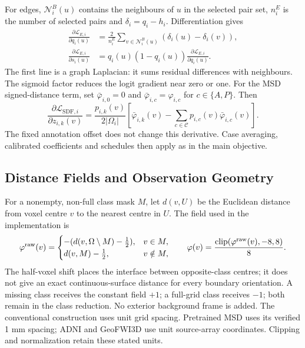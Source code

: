 For edges, $\mathcal N_i^B(u)$ contains the neighbours of $u$ in the
selected pair set, $n_i^E$ is the number of selected pairs and
$\delta_i=q_i-h_i$. Differentiation gives
\begin{equation}
\begin{aligned}
\frac{\partial\mathcal L_{E,i}}{\partial q_i(u)}
 &=\frac{2}{n_i^E}\sum_{v\in\mathcal N_i^B(u)}
     (\delta_i(u)-\delta_i(v)),\\
\frac{\partial\mathcal L_{E,i}}{\partial s_i(u)}
 &=q_i(u)(1-q_i(u))\frac{\partial\mathcal L_{E,i}}{\partial q_i(u)}.
\end{aligned}\label{eq:edge-logit-gradient}
\end{equation}
The first line is a graph Laplacian: it sums residual differences with
neighbours. The sigmoid factor reduces the logit gradient near zero or
one. For the MSD signed-distance term, set $\bar\varphi_{i,0}=0$ and
$\bar\varphi_{i,c}=\varphi_{i,c}$ for $c\in\{A,P\}$. Then
\begin{equation}
\frac{\partial\mathcal L_{\mathrm{SDF},i}}{\partial z_{i,k}(v)}
=\frac{p_{i,k}(v)}{2|\Omega_i|}
 \left[\bar\varphi_{i,k}(v)-\sum_{c\in\mathcal C}
 p_{i,c}(v)\bar\varphi_{i,c}(v)\right].
\label{eq:sdf-logit-gradient}
\end{equation}
The fixed annotation offset does not change this derivative. Case
averaging, calibrated coefficients and schedules then apply as in the
main objective.

\subsection{Distance Fields and Observation Geometry}
\label{sec:sdf-construction-details}

For a nonempty, non-full class mask $M$, let $d(v,U)$ be the Euclidean
distance from voxel centre $v$ to the nearest centre in $U$. The field
used in the implementation is
\begin{equation}
\varphi^{\rm raw}(v)=
\begin{cases}
-(d(v,\Omega\setminus M)-\tfrac12), & v\in M,\\
d(v,M)-\tfrac12, & v\notin M,
\end{cases}
\qquad
\varphi(v)=\frac{\operatorname{clip}(\varphi^{\rm raw}(v),-8,8)}{8}.
\label{eq:sdf-half-voxel-field}
\end{equation}
The half-voxel shift places the interface between opposite-class
centres; it does not give an exact continuous-surface distance for every
boundary orientation. A missing class receives the constant field $+1$;
a full-grid class receives $-1$; both remain in the class reduction.
No exterior background frame is added. The conventional construction uses unit grid
spacing. Pretrained MSD uses its verified 1 mm spacing; ADNI and
GeoFWI3D use unit source-array coordinates. Clipping and normalization
retain these stated units.

